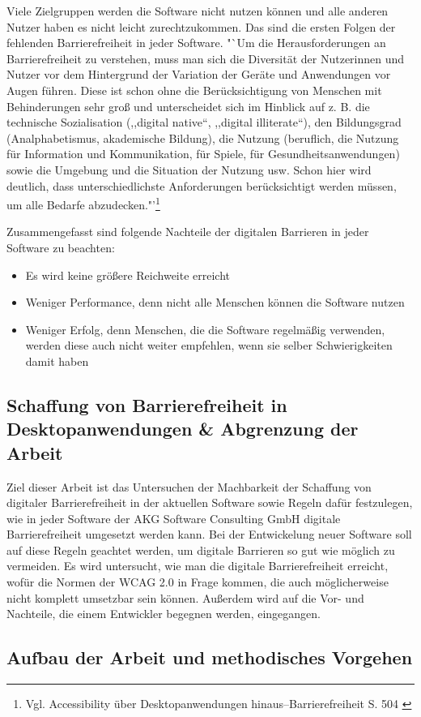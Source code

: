 Viele Zielgruppen werden die Software nicht nutzen können und alle anderen Nutzer haben es nicht leicht zurechtzukommen. Das sind die ersten Folgen der fehlenden Barrierefreiheit in jeder Software. "`Um die Herausforderungen an Barrierefreiheit zu verstehen, muss man sich die Diversität der Nutzerinnen und Nutzer vor dem Hintergrund der Variation der Geräte und Anwendungen vor Augen führen. Diese ist schon ohne die Berücksichtigung von Menschen mit Behinderungen sehr groß und unterscheidet sich im Hinblick auf z. B. die technische Sozialisation (,,digital native“, ,,digital illiterate“), den Bildungsgrad (Analphabetismus, akademische Bildung), die Nutzung (beruflich, die Nutzung für Information und Kommunikation, für Spiele, für Gesundheitsanwendungen) sowie die Umgebung und die Situation der Nutzung usw. Schon hier wird deutlich, dass unterschiedlichste Anforderungen berücksichtigt werden müssen, um alle Bedarfe abzudecken."'\footnote{Vgl. Accessibility über Desktopanwendungen hinaus–Barrierefreiheit S. 504 \cite{buhler2017accessibility}}

Zusammengefasst sind folgende Nachteile der digitalen Barrieren in jeder Software zu beachten:
\vspace{1em}

\begin{itemize}
	\item Es wird keine größere Reichweite erreicht
	\item Weniger Performance, denn nicht alle Menschen können die Software nutzen
	\item Weniger Erfolg, denn Menschen, die die Software regelmäßig verwenden, werden diese auch nicht weiter empfehlen, wenn sie selber Schwierigkeiten damit haben
\end{itemize}



\subsection{Schaffung von Barrierefreiheit in Desktopanwendungen \& Abgrenzung der Arbeit}
Ziel dieser Arbeit ist das Untersuchen der Machbarkeit der Schaffung von digitaler Barrierefreiheit in der aktuellen Software sowie Regeln dafür festzulegen, wie in jeder Software der AKG Software Consulting GmbH digitale Barrierefreiheit umgesetzt werden kann. Bei der Entwickelung neuer Software soll auf diese Regeln geachtet werden, um digitale Barrieren so gut wie möglich zu vermeiden. Es wird untersucht, wie man die digitale Barrierefreiheit erreicht, wofür die Normen der \ac{WCAG} 2.0 in Frage kommen, die auch möglicherweise nicht komplett umsetzbar sein können. Außerdem wird auf die Vor- und Nachteile, die einem Entwickler begegnen werden, eingegangen.

\subsection{Aufbau der Arbeit und methodisches Vorgehen}
